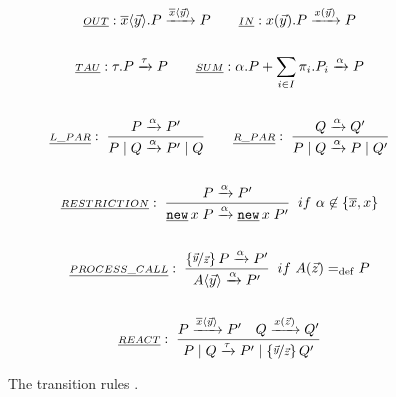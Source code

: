\begin{figure}[H]
\begin{gather*}
\underline{\scriptstyle{OUT}}: \out{x}{\vec{y}}.P \transs{\out{x}{\vec{y}}} P
\quad\quad
\underline{\scriptstyle{IN}}: \inp{x}{\vec{y}}.P \transs{\inp{x}{\vec{y}}} P
\\\\
\underline{\scriptstyle{TAU}}: \tau.P \transs{\tau} P
\quad\quad
\underline{\scriptstyle{SUM}}: \procchoice{\alpha.P}{\procsum} \transs{\alpha} P
\\\\
\kalRule[]{L\_PAR}{}{P \transs{\alpha} P'}{\procpar{P}{Q} \transs{\alpha} \procpar{P'}{Q}}
\quad\quad
\kalRule[]{R\_PAR}{}{Q \transs{\alpha} Q'}{\procpar{P}{Q} \transs{\alpha} \procpar{P}{Q'}}
\\\\
\kalRule[if\ \alpha \nin \{\overline{x},x\}]{RESTRICTION}{}{P \transs{\alpha} P'}{\procres{x}{P} \transs{\alpha} \procres{x}{P'}}
\\\\
\kalRule[if\ \procdef{A}{\vec{z}}\define{}P]{PROCESS\_CALL}{}{\substitue{\vec{y}}{\vec{z}}P \transs{\alpha} P'}{\proccall{A}{\vec{y}} \transs{\alpha} P'}
\\\\
\kalRule[]{REACT}{P \transs{\out{x}{\vec{y}}} P'}{Q \transs{\inp{x}{\vec{z}}} Q'}{\procpar{P}{Q} \transs{\tau} \procpar{P'}{\substitue{\vec{y}}{\vec{z}}Q'}}
\end{gather*}
\caption{The transition rules \cite{milner}.}
\label{fig_transition_rules}
\end{figure}

